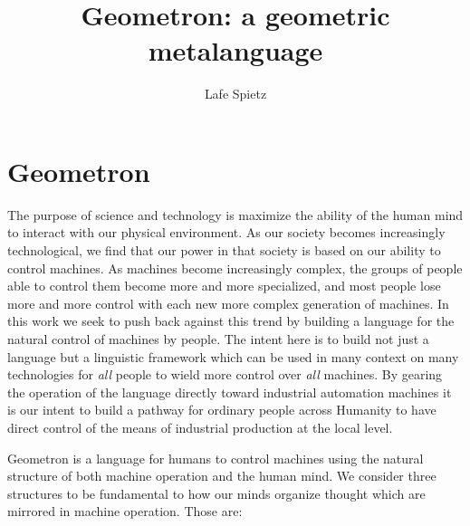 \documentclass[12pt,a4paper]{amsart}
\numberwithin{equation}{section}
\begin{document}
\title{Geometron: a geometric metalanguage}

\author{Lafe Spietz}

\maketitle
\section{Geometron}\label{geometron}

The purpose of science and technology is maximize the ability of the
human mind to interact with our physical environment. As our society
becomes increasingly technological, we find that our power in that
society is based on our ability to control machines. As machines become
increasingly complex, the groups of people able to control them become
more and more specialized, and most people lose more and more control
with each new more complex generation of machines. In this work we seek
to push back against this trend by building a language for the natural
control of machines by people. The intent here is to build not just a
language but a linguistic framework which can be used in many context on
many technologies for \emph{all} people to wield more control over
\emph{all} machines. By gearing the operation of the language directly
toward industrial automation machines it is our intent to build a
pathway for ordinary people across Humanity to have direct control of
the means of industrial production at the local level.

Geometron is a language for humans to control machines using the natural
structure of both machine operation and the human mind. We consider
three structures to be fundamental to how our minds organize thought
which are mirrored in machine operation. Those are:
\end{document}
